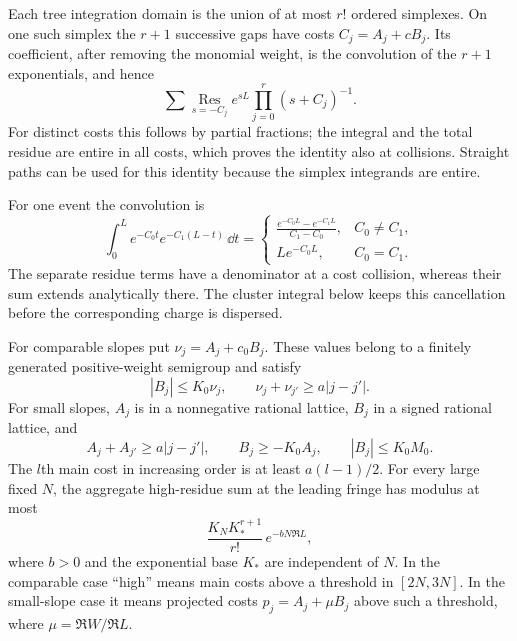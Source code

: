 Each tree integration domain is the union of at most $r!$ ordered
simplexes. On one such simplex the $r+1$ successive gaps have costs
$C_j=A_j+cB_j$. Its coefficient, after removing the monomial weight,
is the convolution of the $r+1$ exponentials, and hence
\begin{equation}\label{eq:mixed-residue}
 \sum\operatorname*{Res}_{s=-C_j}
       e^{sL}\prod_{j=0}^r(s+C_j)^{-1}.
\end{equation}
For distinct costs this follows by partial fractions; the integral
and the total residue are entire in all costs, which proves the
identity also at collisions. Straight paths can be used for this
identity because the simplex integrands are entire.

\begin{example}\label{ex:mixed-cost-collision}
For one event the convolution is
\[
 \int_0^L e^{-C_0t}e^{-C_1(L-t)}\,\dd t
 =\begin{cases}
 \displaystyle\frac{e^{-C_0L}-e^{-C_1L}}{C_1-C_0},&C_0\ne C_1,\\[6pt]
 Le^{-C_0L},&C_0=C_1.
 \end{cases}
\]
The separate residue terms have a denominator at a cost collision,
whereas their sum extends analytically there.  The cluster integral
below keeps this cancellation before the corresponding charge is
dispersed.
\end{example}

\begin{lemma}\label{lem:mixed-tree}
For comparable slopes put $\nu_j=A_j+c_0B_j$. These values belong
to a finitely generated positive-weight semigroup and satisfy
\begin{equation}\label{eq:mixed-comparable-costs}
 |B_j|\leq K_0\nu_j,\qquad
 \nu_j+\nu_{j'}\geq a|j-j'|.
\end{equation}
For small slopes, $A_j$ is in a nonnegative rational lattice, $B_j$
in a signed rational lattice, and
\begin{equation}\label{eq:mixed-small-costs}
 A_j+A_{j'}\geq a|j-j'|,\qquad
 B_j\geq-K_0A_j,\qquad |B_j|\leq K_0M_0.
\end{equation}
The $l$th main cost in increasing order is at least $a(l-1)/2$.
For every large fixed $N$, the aggregate high-residue sum at the
leading fringe has modulus at most
\begin{equation}\label{eq:mixed-high-residues}
 \frac{K_N K_*^{r+1}}{r!}\,e^{-bN\Re L},
\end{equation}
where $b>0$ and the exponential base $K_*$ are independent of $N$.
In the comparable case ``high'' means main costs above a threshold
in $[2N,3N]$. In the small-slope case it means projected costs
$p_j=A_j+\mu B_j$ above such a threshold, where
$\mu=\Re W/\Re L$.
\end{lemma}


